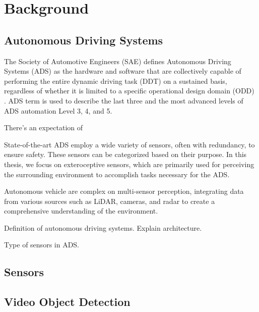 \section{Background}  \label{Background}

\subsection{Autonomous Driving Systems} \label{Background:ADS}

The Society of Automotive Engineers (SAE) defines Autonomous Driving Systems (ADS) as the hardware and software that are collectively capable of performing the entire dynamic driving task (DDT) on a sustained basis, regardless of whether it is limited to a specific operational design domain (ODD) \cite{sae:j3016:2021apr}. ADS term is used to describe the last three and the most advanced levels of ADS automation Level 3, 4, and 5.

There's an expectation of 

State-of-the-art ADS employ a wide variety of sensors, often with redundancy, to ensure safety. These sensors can be categorized based on their purpose. In this thesis, we focus on exteroceptive sensors, which are primarily used for perceiving the surrounding environment to accomplish tasks necessary for the ADS.






Autonomous vehicle are complex on multi-sensor perception, integrating data from various sources such as LiDAR, cameras, and radar to create a comprehensive understanding of the environment.

Definition of autonomous driving systems. Explain architecture.

Type of sensors in ADS.

\subsection{Sensors} \label{Background:Sensors}



\subsection{Video Object Detection} \label{Background:VideoObjectDetection}

